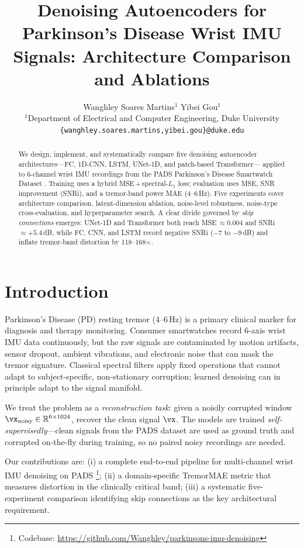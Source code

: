 \documentclass{article}
\title{Denoising Autoencoders for Parkinson's Disease
Wrist IMU Signals: Architecture Comparison and Ablations}
\author{%
  Wanghley Soares Martins$^{1}$ \And Yibei Gou$^{1}$ \\
  {}$^{1}$Department of Electrical and Computer Engineering, Duke University \\
  \texttt{\{wanghley.soares.martins,\;yibei.gou\}@duke.edu}
}
\begin{document}
\maketitle

\begin{abstract}
We design, implement, and systematically compare five denoising autoencoder
architectures---FC, 1D-CNN, LSTM, UNet-1D, and patch-based Transformer---
applied to 6-channel wrist IMU recordings from the PADS Parkinson's Disease
Smartwatch Dataset \citep{varghese2023pads}.
Training uses a hybrid MSE\,+\,spectral-$L_1$ loss; evaluation uses MSE,
SNR improvement (SNRi), and a tremor-band power MAE (4--6\,Hz).
Five experiments cover architecture comparison, latent-dimension ablation,
noise-level robustness, noise-type cross-evaluation, and hyperparameter
search.
A clear divide governed by \emph{skip connections} emerges: UNet-1D and
Transformer both reach MSE\,$\approx 0.004$ and SNRi\,$\approx +5.4$\,dB,
while FC, CNN, and LSTM record negative SNRi ($-7$ to $-9$\,dB) and inflate
tremor-band distortion by 118--168$\times$.
\end{abstract}

\section{Introduction}
\label{sec:intro}

Parkinson's Disease (PD) resting tremor (4--6\,Hz) is a primary clinical
marker for diagnosis and therapy monitoring.
Consumer smartwatches record 6-axis wrist IMU data continuously, but the raw
signals are contaminated by motion artifacts, sensor dropout, ambient
vibrations, and electronic noise that can mask the tremor signature.
Classical spectral filters apply fixed operations that cannot adapt to
subject-specific, non-stationary corruption; learned denoising can in
principle adapt to the signal manifold.

We treat the problem as a \emph{reconstruction task}: given a noisily
corrupted window $\vx_{\text{noisy}} \in \mathbb{R}^{6\times1024}$,
recover the clean signal $\vx$.
The models are trained \emph{self-supervisedly}---clean signals from the PADS
dataset are used as ground truth and corrupted on-the-fly during training,
so no paired noisy recordings are needed.

Our contributions are: (i) a complete end-to-end pipeline for multi-channel
wrist IMU denoising on PADS \footnote{Codebase: \url{https://github.com/Wanghley/parkinsons-imu-denoising}}; (ii) a domain-specific TremorMAE metric that
measures distortion in the clinically critical band; (iii) a systematic
five-experiment comparison identifying skip connections as the key architectural
requirement.
\end{document}
